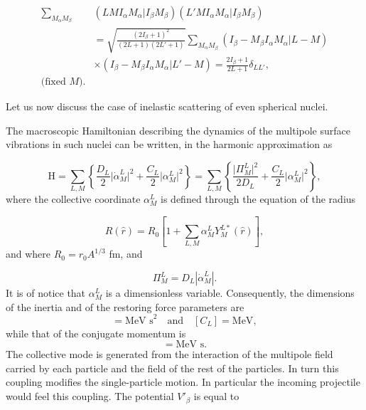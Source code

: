 \begin{subappendices}
\begin{equation}\label{eq4l10}
\begin{split}
\sum_{M_\alpha M_\beta}&(LMI_\alpha M_\alpha \vert I_\beta M_\beta)
 (L' M I_\alpha M_\alpha \vert I_\beta M_\beta)\\
& =\sqrt{\frac{(2 I_\beta+1)^2}{(2L+1)(2L'+1)}} \sum_{M_\alpha M_\beta}
(I_\beta -M_\beta  I_\alpha M_\alpha \vert L -M)\\
&\times(I_\beta -M_\beta  I_\alpha M_\alpha \vert L' -M)=\frac{2 I_\beta+1}{2 L+1} \delta_{L L'},\\
\text{(fixed $M$)}.
\end{split}
\end{equation}


Let us now discuss the case of inelastic scattering of even spherical nuclei.


The macroscopic Hamiltonian describing the dynamics of the multipole surface vibrations in such nuclei can be written, in the harmonic approximation as

\begin{equation}\label{eq4l11}
\mathrm{H}=\sum_{L,M} \left\{ \frac{D_L}{2} \vert \dot{\alpha}_M^L \vert^2+
\frac{C_L}{2} \vert \alpha_M^L \vert^2 \right\}=\sum_{L,M} \left\{  \frac{\vert \Pi_M^L \vert^2}{2D_L}+
\frac{C_L}{2} \vert \alpha_M^L \vert^2 \right\},
\end{equation}
where the collective coordinate $\alpha_M^L$ is defined through the equation of the radius

\begin{equation}\label{eq4l12}
R(\hat r)= R_0 \left[1+\sum_{L,M} \alpha_M^L Y_M^{L*}(\hat r) \right],
\end{equation}
and where $R_0=r_0 A^{1/3}$ fm, and 

\begin{equation}
\Pi_M^L=D_L\left|\dot\alpha_M^L\right|.
\end{equation}
It is of notice that $\alpha_M^L$ is a dimensionless variable. Consequently, the dimensions of the inertia and of the restoring force parameters are   
\begin{equation}
[D_L]=\text{MeV s}^2\quad \text{and}\quad [C_L]=\text{MeV},
\end{equation}
while that of the conjugate momentum is 
\begin{equation}
[\Pi_M^L]=\text{MeV s}.
\end{equation}
The collective mode is generated from the interaction of the multipole field carried by each particle and the field of the rest of the particles. In turn this coupling modifies the single-particle motion. In particular the incoming projectile would feel this coupling. The potential $V'_\beta$ is equal to


\end{subappendices}
